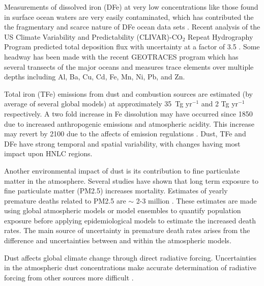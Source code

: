 Measurements of dissolved iron (DFe) at very low concentrations like those found in surface ocean waters are very easily contaminated, which has contributed the the fragmentary and scarce nature of DFe ocean data sets \cite{Rijkenberg_2014}.
Recent analysis of the US Climate Variability and Predictability (CLIVAR)-CO$_{2}$ Repeat Hydrography Program predicted total deposition flux with uncertainty at a factor of 3.5 \cite{Grand_2015}.
Some headway has been made with the recent GEOTRACES program which has several transects of the major oceans and measures trace elements over multiple depths including Al, Ba, Cu, Cd, Fe, Mn, Ni, Pb, and Zn.
  
Total iron (TFe) emissions from dust and combustion sources are estimated (by average of several global models) at approximately 35~Tg yr$^{-1}$ and 2 Tg yr$^{-1}$ respectively. A two fold increase in Fe dissolution may have occurred since 1850 due to increased anthropogenic emissions and atmospheric acidity.
This increase may revert by 2100 due to the affects of emission regulations \cite{Myriokefalitakis_2015}.
Dust, TFe and DFe have strong temporal and spatial variability, with changes having most impact upon HNLC regions.

Another environmental impact of dust is its contribution to fine particulate matter in the atmosphere.
Several studies have shown that long term exposure to fine particulate matter (PM2.5) increases mortality. 
Estimates of yearly premature deaths related to PM2.5 are $\sim$ 2-3 million \cite{Hoek_2013, 19627030, Silva_2013, Lelieveld_2015}.   
These estimates are made using global atmospheric models or model ensembles to quantify population exposure before applying epidemiological models to estimate the increased death rates.
The main source of uncertainty in premature death rates arises from the difference and uncertainties between and within the atmospheric models.

Dust affects global climate change through direct radiative forcing.
Uncertainties in the atmospheric dust concentrations make accurate determination of radiative forcing from other sources more difficult \cite{IPCC_2013_chap8}.